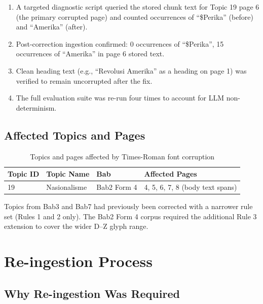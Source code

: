 \documentclass[12pt, a4paper]{report}
\begin{document}
\begin{enumerate}[noitemsep]
  \item A targeted diagnostic script queried the stored chunk text for
        Topic 19 page 6 (the primary corrupted page) and counted occurrences
        of ``\$Perika'' (before) and ``Amerika'' (after).
  \item Post-correction ingestion confirmed: 0 occurrences of ``\$Perika'',
        15 occurrences of ``Amerika'' in page 6 stored text.
  \item Clean heading text (e.g., ``Revolusi Amerika'' as a heading on
        page 1) was verified to remain uncorrupted after the fix.
  \item The full evaluation suite was re-run four times to account for
        LLM non-determinism.
\end{enumerate}

\section{Affected Topics and Pages}

\begin{table}[H]
  \centering
  \caption{Topics and pages affected by Times-Roman font corruption}
  \label{tab:affected_pages}
  \begin{tabular}{llll}
    \toprule
    \textbf{Topic ID} & \textbf{Topic Name} & \textbf{Bab} &
    \textbf{Affected Pages} \\
    \midrule
    19 & Nasionalisme & Bab2 Form 4 & 4, 5, 6, 7, 8 (body text spans) \\
    \bottomrule
  \end{tabular}
\end{table}

Topics from Bab3 and Bab7 had previously been corrected with a narrower rule
set (Rules 1 and 2 only). The Bab2 Form 4 corpus required the additional Rule 3
extension to cover the wider D--Z glyph range.


\chapter{Re-ingestion Process}

\section{Why Re-ingestion Was Required}
\end{document}
